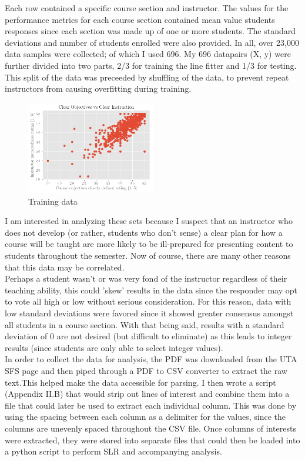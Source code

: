 \documentclass[10pt]{report}
\begin{document}
Each row contained a specific course section and instructor. The values for the performance metrics for each course section
contained mean value students responses since each section was made up of one or more students. The standard deviations 
and number of students enrolled were also provided. In all, over 23,000 data samples were collected; of which I used 696.
My 696 datapairs (X, y) were further divided into two parts, 2/3 for training the line fitter and 1/3 for testing. This 
split of the data was preceeded by shuffling of the data, to prevent repeat instructors from causing overfitting 
during training. 

\begin{figure}
    \centering
    \includegraphics[width=0.50\textwidth]{results/first_plot}
    \caption{Training data}
\end{figure}

\vspace{5mm}

I am interested in analyzing these sets because I suspect that an instructor who does not develop (or rather, students who 
don't sense) a clear plan for how a course will be taught are more likely to be ill-prepared for presenting 
content to students throughout the semester. Now of course, there are many other reasons that this data may be correlated. \\ 
Perhaps a student wasn't or was very fond of the instructor regardless of their teaching ability, this could 'skew' results
in the data since the responder may opt to vote all high or low without serious consideration. 
For this reason, data with low standard deviations were favored since it showed greater consensus amongst all
students in a course section. With that being said, results with a standard deviation of 0 are not desired (but difficult to eliminate) 
as this leads to integer results (since students are only able to select integer values). \\

In order to collect the data for analysis, the PDF was downloaded from the UTA SFS page and then piped through a PDF to CSV
converter to extract the raw text.This helped make the data accessible for parsing. I then wrote a script (Appendix II.B) that would strip out
lines of interest and combine them into a file that could later be used to extract each individual column. This was done
by using the spacing between each column as a delimiter for the values, since the columns are unevenly spaced throughout
the CSV file. Once columns of interests were extracted, they were stored into separate files that could then be loaded into
a python script to perform SLR and accompanying analysis.
\end{document}
